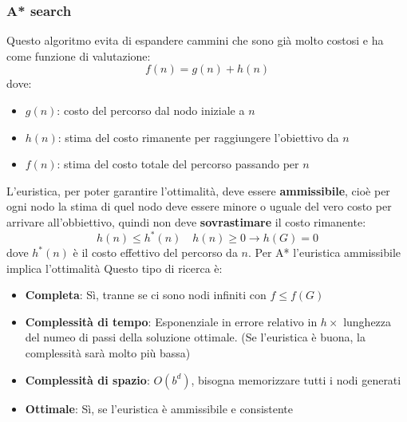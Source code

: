\documentclass[a4paper]{article}
\begin{document}
\subsubsection{A* search}
Questo algoritmo evita di espandere cammini che sono già molto costosi e ha come
funzione di valutazione:
\[
  f(n) = g(n) + h(n)
\] 
dove:
\begin{itemize}
  \item \( g(n) \): costo del percorso dal nodo iniziale a \( n \)
  \item \( h(n) \): stima del costo rimanente per raggiungere l'obiettivo da \( n \)
  \item \( f(n) \): stima del costo totale del percorso passando per \( n \)
\end{itemize}
L'euristica, per poter garantire l'ottimalità, deve essere \textbf{ammissibile}, cioè
per ogni nodo la stima di quel nodo deve essere minore o uguale del vero costo per arrivare
all'obbiettivo, quindi non deve \textbf{sovrastimare} il costo rimanente:
\[
  h(n) \le h^*(n) \quad h(n) \ge 0 \to h(G) = 0
\] 
dove \( h^*(n) \) è il costo effettivo del percorso da \( n \).
\thm{}
{
  Per A* l'euristica ammissibile implica l'ottimalità
}
\noindent
Questo tipo di ricerca è:
\begin{itemize}
  \item \textbf{Completa}: Sì, tranne se ci sono nodi infiniti con \( f \le f(G) \) 
  \item \textbf{Complessità di tempo}: Esponenziale in errore relativo in \( h \times  \) 
    lunghezza del numeo di passi della soluzione ottimale. (Se l'euristica è buona, la
    complessità sarà molto più bassa)
  \item \textbf{Complessità di spazio}: \( O(b^d) \), bisogna memorizzare tutti i nodi
    generati
  \item \textbf{Ottimale}: Sì, se l'euristica è ammissibile e consistente
\end{itemize}
\end{document}

